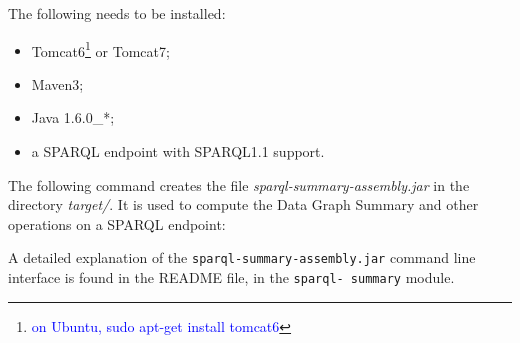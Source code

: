 
The following needs to be installed:
\begin{itemize}
\item Tomcat6\footnote{\textcolor{blue}{on Ubuntu, sudo apt-get install tomcat6}} or Tomcat7;
\item Maven3;
\item Java 1.6.0\_*;
\item a SPARQL endpoint with SPARQL1.1 support.
\end{itemize}

The following command creates the file \emph{sparql-summary-assembly.jar} in the directory \emph{target/}. It is used to compute the Data Graph Summary and other operations on a SPARQL endpoint:

\bigskip
\begin{raggedleft}
\end{raggedleft}

A detailed explanation of the \texttt{sparql-summary-assembly.jar} command line interface is found in the README file, in the \texttt{sparql- summary} module.


